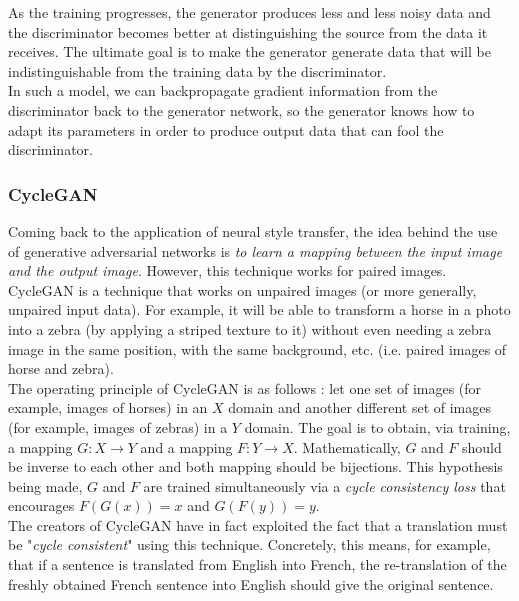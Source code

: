 \documentclass[twocolumn,superscriptaddress,aps, floatfix]{revtex4-1}
\begin{document}
    As the training progresses, the generator produces less and less noisy data and the discriminator becomes better at distinguishing the source from the data it receives. The ultimate goal is to make the generator generate data that will be indistinguishable from the training data by the discriminator.\\
    
    In such a model, we can backpropagate gradient information from the discriminator back to the generator network, so the generator knows how to adapt its parameters in order to produce output data that can fool the discriminator.
    
    \subsubsection{CycleGAN}
    
    Coming back to the application of neural style transfer, the idea behind the use of generative adversarial networks is \emph{to learn a mapping between the input image and the output image}. However, this technique works for paired images. CycleGAN is a technique that works on unpaired images (or more generally, unpaired input data). For example, it will be able to transform a horse in a photo into a zebra (by applying a striped texture to it) without even needing a zebra image in the same position, with the same background, etc. (i.e. paired images of horse and zebra).\\
    
    The operating principle of CycleGAN is as follows : let one set of images (for example, images of horses) in an $X$ domain and another different set of images (for example, images of zebras) in a $Y$ domain. The goal is to obtain, via training, a mapping $G : X \rightarrow Y$ and a mapping $F : Y \rightarrow X$. Mathematically, $G$ and $F$ should be inverse to each other and both mapping should be bijections. This hypothesis being made, $G$ and $F$ are trained simultaneously via a \emph{cycle consistency loss} that encourages $F(G(x)) = x$ and $G(F(y)) = y$.\\
    
    The creators of CycleGAN have in fact exploited the fact that a translation must be "\emph{cycle consistent}" using this technique. Concretely, this means, for example, that if a sentence is translated from English into French, the re-translation of the freshly obtained French sentence into English should give the original sentence.\\
    
\end{document}

